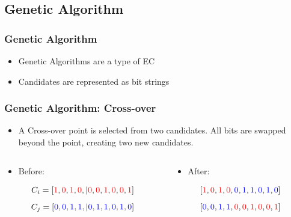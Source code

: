 \documentclass{beamer}
\begin{document}
\subsection{Genetic Algorithm}
\begin{frame}
  \frametitle{Genetic Algorithm}
\begin{itemize}
  \item Genetic Algorithms are a type of EC
  \item Candidates are represented as bit strings
\end{itemize}
\end{frame}

\begin{frame}

  \frametitle{Genetic Algorithm: Cross-over}
\begin{itemize}
  \item A Cross-over point is selected from two candidates. All bits are swapped beyond the point, creating two new candidates.
\end{itemize}
  \begin{columns}
  \begin{column}{0.5\textwidth}
\begin{itemize}
  \item Before:
\end{itemize}
\[
C_i=[ \textcolor{red}{1},  \textcolor{red}{0}, \textcolor{red}{1},  \textcolor{red}{0},|  \textcolor{red}{0},  \textcolor{red}{0}, \textcolor{red}{1}, \textcolor{red}{0}, \textcolor{red}{0}, \textcolor{red}{1} ]
\]
\[C_j=[  \textcolor{blue}{0}, \textcolor{blue}{0}, \textcolor{blue}{1}, \textcolor{blue}{1},| \textcolor{blue}{0}, \textcolor{blue}{1}, \textcolor{blue}{1}, \textcolor{blue}{0}, \textcolor{blue}{1}, \textcolor{blue}{0} ]
\]
\end{column}
 \begin{column}{0.5\textwidth}
\begin{itemize}
  \item After:
\end{itemize}
   \[
[ \textcolor{red}{1},  \textcolor{red}{0}, \textcolor{red}{1},  \textcolor{red}{0}, \textcolor{blue}{0}, \textcolor{blue}{1}, \textcolor{blue}{1}, \textcolor{blue}{0}, \textcolor{blue}{1}, \textcolor{blue}{0} ]
\]
\[ [  \textcolor{blue}{0}, \textcolor{blue}{0}, \textcolor{blue}{1}, \textcolor{blue}{1}, \textcolor{red}{0},  \textcolor{red}{0}, \textcolor{red}{1}, \textcolor{red}{0}, \textcolor{red}{0}, \textcolor{red}{1} ]
\]
  \end{column}
  \end{columns}
\end{frame}
\end{document}
